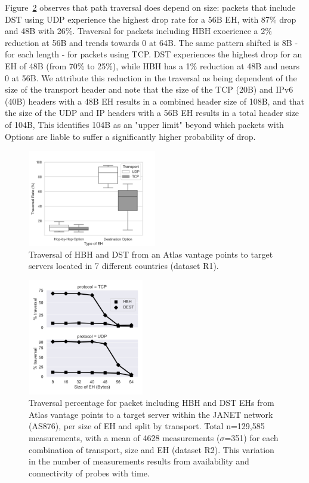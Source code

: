 \documentclass[conference]{IEEEtran}
\begin{document}
Figure~\ref{fig:sizes} observes that path traversal does depend on size: packets that include DST using UDP experience the highest drop rate for a 56B EH, with  87\% drop and 48B with 26\%. Traversal for packets including HBH exoerience a 2\% reduction at 56B and trends towards 0 at 64B.
The same pattern shifted is 8B - for each length - for packets  using TCP. DST experiences the highest drop for an EH of 48B (from 70\% to 25\%), while HBH has a 1\% reduction at 48B and nears 0 at 56B.
We attribute this reduction in the traversal as being dependent of the size of the transport header and note that the size of the TCP (20B) and IPv6 (40B) headers with a 48B EH results in a combined header size of 108B, and that the size of the UDP and IP headers with a 56B EH results in a total header size of 104B, This identifies  104B as an "upper limit" beyond which packets with Options are liable to suffer a significantly higher probability of drop.

\begin{figure}
\centering
  \includegraphics[width=0.5\textwidth]{all_traversal.png}
  \caption{Traversal of HBH and DST from an Atlas vantage points to target servers located in 7 different countries (dataset R1). }
  \label{fig:countrybox}
\end{figure}

\begin{figure}
\centering
  \includegraphics[width=0.45\textwidth]{sizes.png}
  \caption{Traversal percentage for packet including HBH and DST EHs from Atlas vantage points to a target server within the JANET network (AS876), per size of EH and split by transport.  Total n=129,585 measurements, with a mean of 4628 measurements ($\sigma$=351) for each combination of transport, size and EH  (dataset R2). This variation in the number of measurements results from availability and connectivity of  probes  with time.}
  \label{fig:sizes}
\end{figure}
\end{document}
